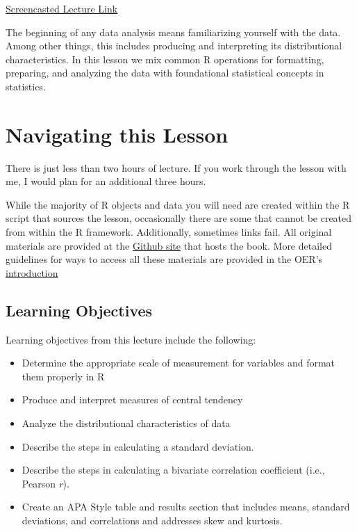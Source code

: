 \documentclass[
  11pt,
]{book}
\providecommand{\tightlist}{%
  \setlength{\itemsep}{0pt}\setlength{\parskip}{0pt}}
\begin{document}
\href{https://spu.hosted.panopto.com/Panopto/Pages/Viewer.aspx?pid=97ec1420-3527-4204-8521-aeff0000afed}{Screencasted Lecture Link}

The beginning of any data analysis means familiarizing yourself with the data. Among other things, this includes producing and interpreting its distributional characteristics. In this lesson we mix common R operations for formatting, preparing, and analyzing the data with foundational statistical concepts in statistics.

\hypertarget{navigating-this-lesson-1}{%
\section{Navigating this Lesson}\label{navigating-this-lesson-1}}

There is just less than two hours of lecture. If you work through the lesson with me, I would plan for an additional three hours.

While the majority of R objects and data you will need are created within the R script that sources the lesson, occasionally there are some that cannot be created from within the R framework. Additionally, sometimes links fail. All original materials are provided at the \href{https://github.com/lhbikos/ReCenterPsychStats}{Github site} that hosts the book. More detailed guidelines for ways to access all these materials are provided in the OER's \protect\hyperlink{ReCintro}{introduction}

\hypertarget{learning-objectives-1}{%
\subsection{Learning Objectives}\label{learning-objectives-1}}

Learning objectives from this lecture include the following:

\begin{itemize}
\tightlist
\item
  Determine the appropriate scale of measurement for variables and format them properly in R
\item
  Produce and interpret measures of central tendency
\item
  Analyze the distributional characteristics of data
\item
  Describe the steps in calculating a standard deviation.
\item
  Describe the steps in calculating a bivariate correlation coefficient (i.e., Pearson \emph{r}).
\item
  Create an APA Style table and results section that includes means, standard deviations, and correlations and addresses skew and kurtosis.
\end{itemize}
\end{document}
